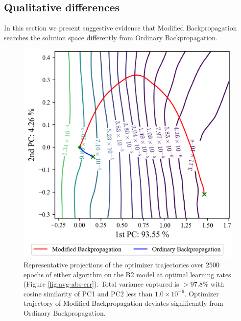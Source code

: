 \documentclass{article}
\theoremstyle{plain}
\theoremstyle{definition}
\theoremstyle{remark}
\begin{document}

\subsection{Qualitative differences}
\label{sec:experiment-qual}
%
In this section we present suggestive evidence that Modified Backpropagation searches the solution space differently from Ordinary Backpropagation.
%
\begin{figure}[h]
    \centering
    \includegraphics[width=0.9\columnwidth]{./resources/pca_b2.png}
    \caption{Representative projections of the optimizer trajectories over 2500 epochs of either algorithm on the B2 model at optimal learning rates (Figure \ref{fig:avg-abs-err}). Total variance captured is $>97.8\%$ with cosine similarity of PC1 and PC2 less than $1.0\times10^{-6}$. Optimizer trajectory of Modified Backpropagation deviates significantly from Ordinary Backpropagation.}
    \label{fig:pca-b2}
\end{figure}
\end{document}
